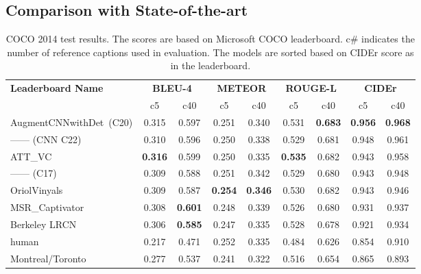 \subsection{Comparison with State-of-the-art}
\begin{table}[htp]
  \newcommand{\mct}[1]{%
    \multicolumn{2}{c|}{\bf#1}}
  \centering
  \begin{adjustbox}{center}
  \begin{tabular}{|l|c|c|c|c|c|c|c|c|}
    \hline\hline
    \multirow{2}{*}{\bf Leaderboard Name}
                       &\mct{BLEU-4} &\mct{METEOR} &\mct{ROUGE-L}&\mct{CIDEr}\\\cline{2-9}
                    & c5    & c40   &  c5   & c40   & c5  &  c40  &  c5  &  c40 \\\hline\hline
    AugmentCNNwithDet~(C20)& 0.315 & 0.597 & 0.251 &0.340& 0.531 &\bf0.683&\bf0.956&\bf0.968\\
    ------ (CNN C22) & 0.310 & 0.596 & 0.250 &0.338& 0.529 & 0.681& 0.948& 0.961\\
    ATT\_VC~\cite{you2016image}& \bf0.316&0.599 & 0.250 &0.335&\bf0.535&0.682& 0.943& 0.958\\
    ------ (C17)  &  0.309 & 0.588 & 0.251 &0.342& 0.529 & 0.680& 0.943& 0.948\\
    OriolVinyals~\cite{Vinyals_2015_CVPR}      & 0.309 & 0.587 &\bf0.254&\bf0.346& 0.530 & 0.682& 0.943& 0.946\\
    MSR\_Captivator~\cite{Fang2015}  & 0.308 &\bf0.601& 0.248 &0.339& 0.526 & 0.680& 0.931& 0.937\\
    Berkeley LRCN~\cite{donahue2015long}   & 0.306 &\bf0.585& 0.247 &0.335& 0.528 & 0.678& 0.921& 0.934\\
    human~\cite{Chen2015}   & 0.217 & 0.471 & 0.252 &0.335& 0.484 & 0.626 & 0.854 & 0.910\\
    Montreal/Toronto~\cite{Xu2015show} & 0.277 & 0.537 & 0.241 &0.322& 0.516 & 0.654 & 0.865 & 0.893\\
    \hline \hline
  \end{tabular}
  \end{adjustbox}
  \caption{COCO 2014 test results. The scores are based on Microsoft
  COCO leaderboard. c\# indicates the number
  of reference captions used in evaluation. The models are sorted
  based on CIDEr score as in the leaderboard.}
  \label{tab:resCocLeaderTest}
\end{table}

